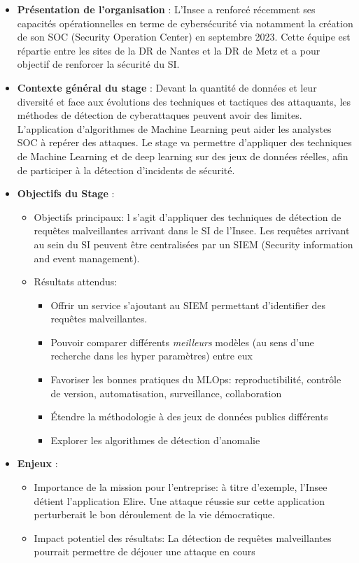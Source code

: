 \documentclass[
  letterpaper,
  DIV=11,
  numbers=noendperiod]{scrartcl}
\providecommand{\tightlist}{%
  \setlength{\itemsep}{0pt}\setlength{\parskip}{0pt}}\usepackage{longtable,booktabs,array}
\begin{document}
\begin{itemize}
\item
  \textbf{Présentation de l'organisation} : L'Insee a renforcé récemment
  ses capacités opérationnelles en terme de cybersécurité via notamment
  la création de son SOC (Security Operation Center) en septembre 2023.
  Cette équipe est répartie entre les sites de la DR de Nantes et la DR
  de Metz et a pour objectif de renforcer la sécurité du SI.
\item
  \textbf{Contexte général du stage} : Devant la quantité de données et
  leur diversité et face aux évolutions des techniques et tactiques des
  attaquants, les méthodes de détection de cyberattaques peuvent avoir
  des limites. L'application d'algorithmes de Machine Learning peut
  aider les analystes SOC à repérer des attaques. Le stage va permettre
  d'appliquer des techniques de Machine Learning et de deep learning sur
  des jeux de données réelles, afin de participer à la détection
  d'incidents de sécurité.
\item
  \textbf{Objectifs du Stage} :

  \begin{itemize}
  \tightlist
  \item
    Objectifs principaux: l s'agit d'appliquer des techniques de
    détection de requêtes malveillantes arrivant dans le SI de l'Insee.
    Les requêtes arrivant au sein du SI peuvent être centralisées par un
    SIEM (Security information and event management).
  \item
    Résultats attendus:

    \begin{itemize}
    \tightlist
    \item
      Offrir un service s'ajoutant au SIEM permettant d'identifier des
      requêtes malveillantes.
    \item
      Pouvoir comparer différents \emph{meilleurs} modèles (au sens
      d'une recherche dans les hyper paramètres) entre eux
    \item
      Favoriser les bonnes pratiques du MLOps: reproductibilité,
      contrôle de version, automatisation, surveillance, collaboration
    \item
      Étendre la méthodologie à des jeux de données publics différents
    \item
      Explorer les algorithmes de détection d'anomalie
    \end{itemize}
  \end{itemize}
\item
  \textbf{Enjeux} :

  \begin{itemize}
  \tightlist
  \item
    Importance de la mission pour l'entreprise: à titre d'exemple,
    l'Insee détient l'application Elire. Une attaque réussie sur cette
    application perturberait le bon déroulement de la vie démocratique.
  \item
    Impact potentiel des résultats: La détection de requêtes
    malveillantes pourrait permettre de déjouer une attaque en cours
  \end{itemize}
\end{itemize}
\end{document}
